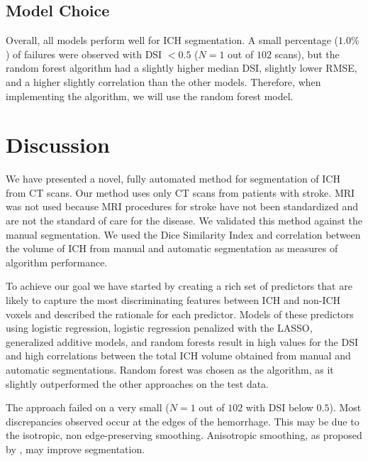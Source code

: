 \documentclass{elsarticle_nonatbib}\usepackage[]{graphicx}\usepackage[]{color}
\begin{document}
\subsection{Model Choice}
Overall, all models perform well for ICH segmentation.  A small percentage ($1.0\%$) of failures were observed with DSI $< 0.5$ ($N = 1$ out of $102$ scans), but the random forest algorithm had a slightly higher median DSI, slightly lower RMSE, and a higher slightly correlation than the other models.  Therefore, when implementing the algorithm, we will use the random forest model.



\section{Discussion}
We have presented a novel, fully automated method for segmentation of ICH from CT scans. Our method uses only CT scans from patients with stroke.  MRI was not 
used because MRI procedures for stroke have not been standardized and are not the standard of care for the disease. We validated this method against the manual segmentation.  We used the Dice Similarity Index and correlation between the volume of ICH from manual and automatic segmentation as measures of algorithm performance.  


To achieve our goal we have started by creating a rich set of predictors that are likely to capture the most discriminating features between ICH and non-ICH voxels and described the rationale for each predictor.  Models of these predictors using logistic regression, logistic regression penalized with the LASSO, generalized additive models, and random forests result in high values for the DSI and high correlations between the total ICH volume obtained from manual and automatic segmentations.  Random forest was chosen as the algorithm, as it slightly outperformed the other approaches on the test data.


The approach failed on a very small ($N = 1$ out of $102$ with DSI below $0.5$). Most discrepancies observed occur at the edges of the hemorrhage.  This may be due to the isotropic, non edge-preserving smoothing.  Anisotropic smoothing, as proposed by \citet{perona1994anisotropic}, may improve segmentation.  
\end{document}
